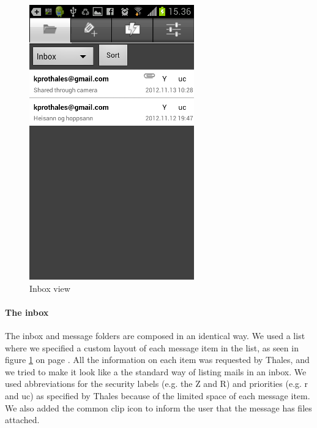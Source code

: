 \begin{figure}[H]
\begin{center}
\includegraphics{inbox_final}
\end{center}
\caption{Inbox view} \label{fig:frontend_inbox}
\end{figure}

\paragraph{The inbox}\hfill
\newline
The inbox and message folders are composed in an identical way. We used a list where we specified a custom layout of each message item in the list, as seen in figure \ref{fig:frontend_inbox} on page \pageref{fig:frontend_inbox}. All the information on each item was requested by Thales, and we tried to make it look like a the standard way of listing mails 
in an inbox. We used abbreviations for the security labels (e.g. the Z and R) and priorities (e.g. r and uc) as specified by Thales because of the limited space of each message item. We also added the common clip icon to inform the user that the message has files attached. 

\newpage

